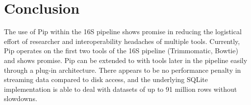 \documentclass[12pt]{article}
\begin{document}



\section{Conclusion} %
\label{sec:conclusion}
The use of Pip within the 16S pipeline shows promise in reducing the logistical
effort of researcher and interoperability headaches of multiple tools. Currently,
Pip operates on the first two tools of the 16S pipeline (Trimmomatic, Bowtie) and
shows promise. Pip can be extended to with tools later in the pipeline easily through
a plug-in architecture. There appears to be no performance penalty in streaming
data compared to disk access, and the underlying SQLite implementation is able to
deal with datasets of up to 91 million rows without slowdowns.
\end{document}

